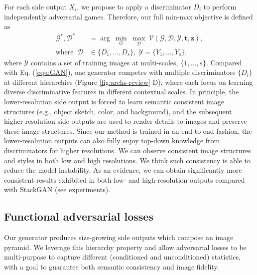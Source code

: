 \documentclass[10pt,twocolumn,letterpaper]{article}
\begin{document}
For each side output $X_i$, we propose to apply a discriminator $D_i$ to perform independently adversarial games. Therefore, our full min-max objective is defined as 
\begin{equation}
\label{equ:optim}
\begin{split}
  \mathcal{G}^*, \mathcal{D}^*&  =  \arg~\underset{G}{\min}\ \underset{\mathcal{D}}{\max}~ \mathcal{V}(\mathcal{G},\mathcal{D}, \mathcal{Y}, \bm t, \bm z), \\
  \text{where} \;\;	 \mathcal{D} & \in  \{D_1, ..., D_s\}, \; \mathcal{Y} = \{Y_1, ..., Y_s\},
\end{split}
\end{equation}
where $ \mathcal{Y}$ contains a set of training images at multi-scales, $\{1,...,s\}$.
Compared with Eq. (\ref{equ:GAN}), one generator competes with multiple discriminators  $\{D_i\}$ at different hierarchies (Figure \ref{fig:archs-review} D), where each focus on learning diverse discriminative features in different contextual scales.
In principle, the lower-resolution side output is forced to learn semantic consistent image structures (e.g., object sketch, color, and background), and the subsequent higher-resolution side outputs are used to render details to images and preserve these image structures. Since our method is trained in an end-to-end fashion, the lower-resolution outputs can also fully enjoy top-down knowledge from discriminators for higher resolutions. We can observe consistent image structures and styles in both low and high resolutions.
We think such consistency is able to reduce the model instability.
As an evidence, we can obtain significantly more consistent results exhibited in both low- and high-resolution outputs compared with StackGAN (see experiments). 


\subsection{Functional adversarial losses}
Our generator produces size-growing side outputs which compose an image pyramid. 
We leverage this hierarchy property and allow adversarial losses to be multi-purpose to capture different (conditioned and unconditioned) statistics, with a goal to guarantee both semantic consistency and image fidelity. 
\end{document}

